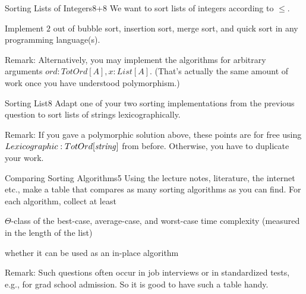 \documentclass[a4paper]{article}
\begin{document}
\header

\begin{problem}{Sorting Lists of Integers}{8+8}
We want to sort lists of integers according to $\leq$.

Implement $2$ out of bubble sort, insertion sort, merge sort, and quick sort in any programming language(s).
\medskip

Remark: Alternatively, you may implement the algorithms for arbitrary arguments $ord:TotOrd[A], x:List[A]$.
(That's actually the same amount of work once you have understood polymorphism.)
\end{problem}

\begin{problem}{Sorting List}{8}
Adapt one of your two sorting implementations from the previous question to sort lists of strings lexicographically.
\medskip

Remark: If you gave a polymorphic solution above, these points are for free using $Lexicographic:TotOrd[\mathit{string}]$ from before.
Otherwise, you have to duplicate your work.
\end{problem}

\begin{problem}{Comparing Sorting Algorithms}{5}
Using the lecture notes, literature, the internet etc., make a table that compares as many sorting algorithms as you can find.
For each algorithm, collect at least
\begin{compactitem}
 \item $\Theta$-class of the best-case, average-case, and worst-case time complexity (measured in the length of the list)
 \item whether it can be used as an in-place algorithm
\end{compactitem}
\medskip

Remark: Such questions often occur in job interviews or in standardized tests, e.g., for grad school admission.
So it is good to have such a table handy.
\end{problem}
\end{document}
